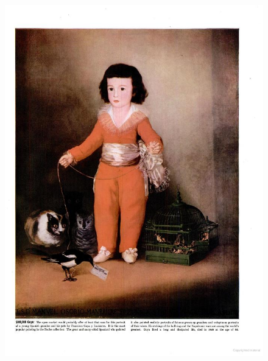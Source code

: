\begin{figure}

\centering
\includegraphics[height=\textheight, width=\textwidth, keepaspectratio]{./images/goya01.jpg}
\end{figure}

